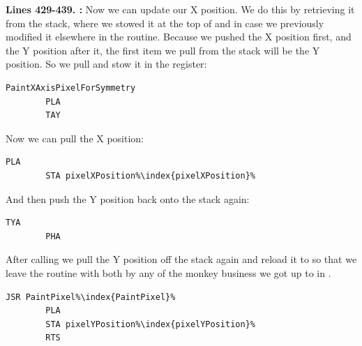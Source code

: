 \textbf{Lines 429-439. :} Now we can update our X position. We do this by retrieving it
from the stack, where we stowed it at the top of  and in case we previously modified it elsewhere in the routine. 
Because we pushed the X position first, and the Y position after it, the first item we pull from the stack will be the Y position.
So we pull and stow it in the  register:

\begin{lstlisting}[escapechar=\%]
PaintXAxisPixelForSymmetry    
        PLA 
        TAY 
\end{lstlisting}

Now we can pull the X position:
\begin{lstlisting}[escapechar=\%]
        PLA 
        STA pixelXPosition%\index{pixelXPosition}%
\end{lstlisting}

And then push the Y position back onto the stack again:
\begin{lstlisting}[escapechar=\%]
        TYA 
        PHA 
\end{lstlisting}

After calling  we pull the Y position off the stack again and reload it to  so that we leave
the routine with both  by any of the monkey business we got up to in .

\begin{lstlisting}[escapechar=\%]
        JSR PaintPixel%\index{PaintPixel}%
        PLA 
        STA pixelYPosition%\index{pixelYPosition}%
        RTS 
\end{lstlisting}

\clearpage
\rhead[]{\leftmark}

